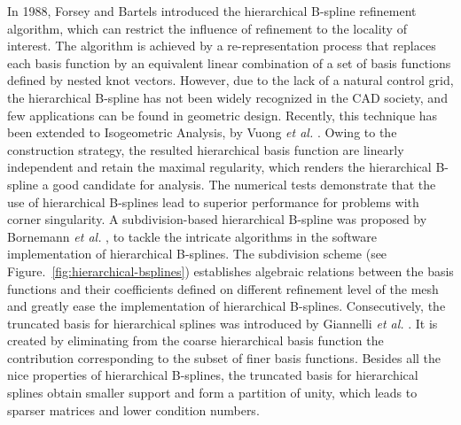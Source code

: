In 1988, Forsey and Bartels \cite{forsey_hierarchical_1988} introduced the hierarchical B-spline refinement algorithm, which can restrict the influence of refinement to the locality of interest. The algorithm is achieved by a re-representation process that replaces each basis function by an equivalent linear combination of a set of basis functions defined by nested knot vectors. However, due to the lack of a natural control grid, the hierarchical B-spline has not been widely recognized in the CAD society, and few applications can be found in geometric design. Recently, this technique has been extended to Isogeometric Analysis, by Vuong \textit{et al.} \cite{vuong_hierarchical_2011}. Owing to the construction strategy, the resulted hierarchical basis function are linearly independent and retain the maximal regularity, which renders the hierarchical B-spline a good candidate for analysis. The numerical tests demonstrate that the use of hierarchical B-splines lead to superior performance for problems with corner singularity. A subdivision-based hierarchical B-spline was proposed by Bornemann \textit{et al.} \cite{bornemann_subdivision-based_2013}, to tackle the intricate algorithms in the software implementation of hierarchical B-splines. The subdivision scheme (see Figure.~\ref{fig:hierarchical-bsplines}) establishes algebraic relations between the basis functions and their coefficients defined on different refinement level of the mesh and greatly ease the implementation of hierarchical B-splines. Consecutively, the truncated basis for hierarchical splines was introduced by Giannelli \textit{et al.} \cite{giannelli_thb-splines:_2012}. It is created by eliminating from the coarse hierarchical basis function the contribution corresponding to the subset of finer basis functions. Besides all the nice properties of hierarchical B-splines, the truncated basis for hierarchical splines obtain smaller support and form a partition of unity, which leads to sparser matrices and lower condition numbers. \par


